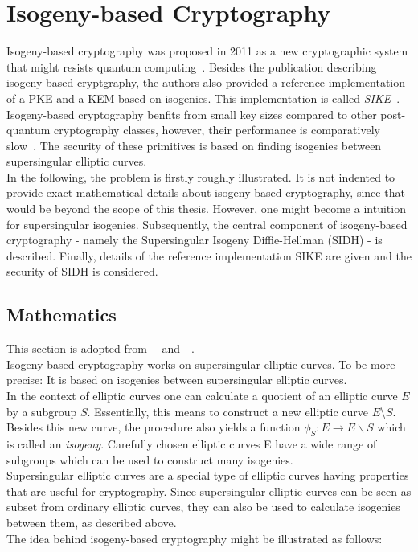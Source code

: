 \section{Isogeny-based Cryptography} \label{sec:isogeny-based_crypto}
Isogeny-based cryptography was proposed in 2011 as a new cryptographic system that might resists quantum computing~\parencite{jao2011towards}. Besides the publication describing isogeny-based cryptgraphy, the authors also provided a reference implementation of a \gls{PKE} and a \gls{KEM} based on isogenies. This implementation is called \textit{\gls{SIKE}}~\parencite{sike2020spec}. Isogeny-based cryptography benfits from small key sizes compared to other post-quantum cryptography classes, however, their performance is comparatively slow~\parencite{sike2020spec}. The security of these primitives is based on finding isogenies between supersingular elliptic curves.\\
In the following, the problem is firstly roughly illustrated. It is not indented to provide exact mathematical details about isogeny-based cryptography, since that would be beyond the scope of this thesis. However, one might become a intuition for supersingular isogenies. Subsequently, the central component of isogeny-based cryptography - namely the Supersingular Isogeny Diffie-Hellman (\gls{SIDH}) - is described. Finally, details of the reference implementation \gls{SIKE} are given and the security of \gls{SIDH} is considered.

\subsection{Mathematics}
This section is adopted from~~\parencite{urbanik2017friendly} and~~\parencite{costello2019supersingular}.\\
Isogeny-based cryptography works on supersingular elliptic curves. To be more precise: It is based on isogenies between supersingular elliptic curves.
\\
In the context of elliptic curves one can calculate a quotient of an elliptic curve $E$ by a subgroup $S$. Essentially, this means to construct a new elliptic curve $E$\textbackslash $S$.
Besides this new curve, the procedure also yields a function $\phi_S: E \to E \backslash S$ which is called an \textit{isogeny}. Carefully chosen elliptic curves E have a wide range of subgroups which can be used to construct many isogenies.
\\
Supersingular elliptic curves are a special type of elliptic curves having properties that are useful for cryptography. Since supersingular elliptic curves can be seen as subset from ordinary elliptic curves, they can also be used to calculate isogenies between them, as described above.
\\
The idea behind isogeny-based cryptography might be illustrated as follows:

